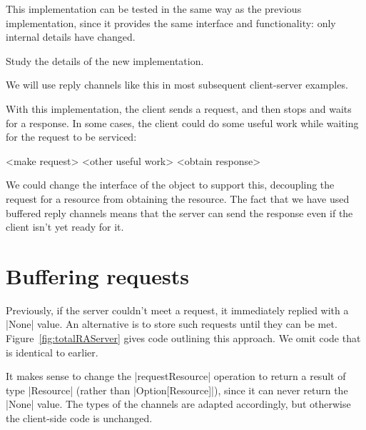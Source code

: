 
This implementation can be tested in the same way as the previous
implementation, since it provides the same interface and functionality: only
internal details have changed. 

\begin{instruction}
Study the details of the new implementation.
\end{instruction}

We will use reply channels like this in most subsequent client-server
examples. 

With this implementation, the client sends a request, and then stops and waits
for a response.  In some cases, the client could do some useful work while
waiting for the request to be serviced:
%
\begin{scala}
  <make request>
  <other useful work>
  <obtain response>
\end{scala}
%
We could change the interface of the object to support this, decoupling the
request for a resource from obtaining the resource.
The fact that we have used buffered reply channels means that the server can
send the response even if the client isn't yet ready for it.  


\section{Buffering requests}

Previously, if the server couldn't meet a request, it immediately replied with
a |None| value.  An alternative is to store such requests until they can be
met.  
%
Figure~\ref{fig:totalRAServer} gives code outlining this approach.  We omit
code that is identical to earlier.

It makes sense to change the |requestResource| operation to return a result of
type |Resource| (rather than |Option[Resource]|), since it can never return
the |None| value.  The types of the channels are adapted accordingly, but
otherwise the client-side code is unchanged.


